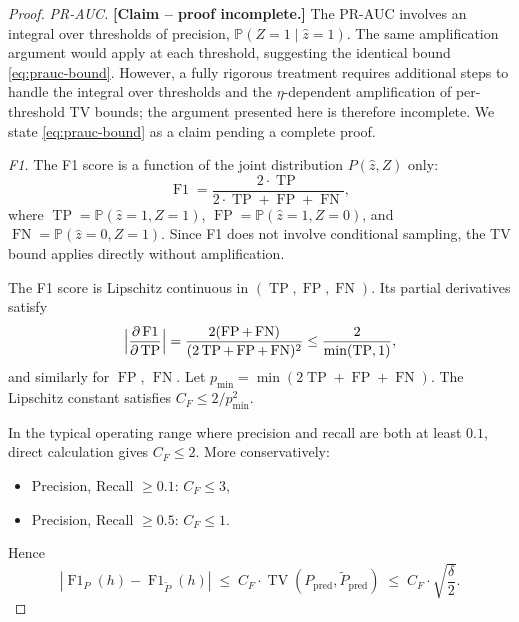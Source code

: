 \begin{proof}
\emph{PR-AUC.} \textbf{[Claim -- proof incomplete.]}
The PR-AUC involves an integral over thresholds of precision,
$\mathbb{P}(Z=1 \mid \hat{z}=1)$. The same amplification argument would apply at
each threshold, suggesting the identical bound
\eqref{eq:prauc-bound}. However, a fully rigorous treatment requires
additional steps to handle the integral over thresholds and the
$\eta$-dependent amplification of per-threshold TV bounds; the
argument presented here is therefore incomplete. We state
\eqref{eq:prauc-bound} as a claim pending a complete proof.

\emph{F1.} The F1 score is a function of the joint distribution
$P(\hat{z}, Z)$ only:
\[
\operatorname{F1} = \frac{2 \cdot \operatorname{TP}}
                         {2 \cdot \operatorname{TP}
                          + \operatorname{FP} + \operatorname{FN}},
\]
where $\operatorname{TP} = \mathbb{P}(\hat{z}=1, Z=1)$,
$\operatorname{FP} = \mathbb{P}(\hat{z}=1, Z=0)$, and
$\operatorname{FN} = \mathbb{P}(\hat{z}=0, Z=1)$. Since F1 does not involve
conditional sampling, the TV bound applies directly without amplification.

The F1 score is Lipschitz continuous in $( \operatorname{TP},
\operatorname{FP}, \operatorname{FN})$. Its partial derivatives satisfy
\[
\Bigl|\frac{\partial \operatorname{F1}}{\partial \operatorname{TP}}\Bigr|
= \frac{2(\operatorname{FP}+\operatorname{FN})}
       {(2\operatorname{TP}+\operatorname{FP}+\operatorname{FN})^2}
\leq \frac{2}{\min(\operatorname{TP}, 1)},
\]
and similarly for $\operatorname{FP}$, $\operatorname{FN}$. Let
$p_{\min} = \min(2\operatorname{TP}+\operatorname{FP}+\operatorname{FN})$.
The Lipschitz constant satisfies $C_F \leq 2/p_{\min}^2$.

In the typical operating range where precision and recall are both at least
$0.1$, direct calculation gives $C_F \leq 2$. More conservatively:
\begin{itemize}
  \item Precision, Recall $\geq 0.1$: $C_F \leq 3$,
  \item Precision, Recall $\geq 0.5$: $C_F \leq 1$.
\end{itemize}
Hence
\begin{equation}
|\operatorname{F1}_P(h) - \operatorname{F1}_{\tilde{P}}(h)|
\;\leq\; C_F \cdot \operatorname{TV}(P_{\text{pred}}, \tilde{P}_{\text{pred}})
\;\leq\; C_F \cdot \sqrt{\frac{\delta}{2}}.
\label{eq:f1-tv-transfer}
\end{equation}


\end{proof}
